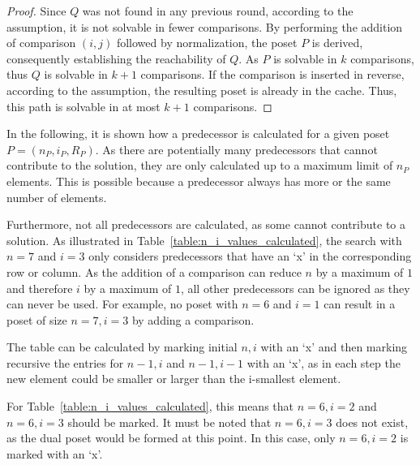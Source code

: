 \documentclass[10pt,journal,compsoc]{IEEEtran}
\begin{document}
\begin{proof} \label{proof:predecessor_calculation}
  Since $Q$ was not found in any previous round, according to the assumption, it is not solvable in fewer comparisons.
  By performing the addition of comparison $(i, j)$ followed by normalization, the poset $P$ is derived, consequently establishing the reachability of $Q$.
  As $P$ is solvable in $k$ comparisons, thus $Q$ is solvable in $k + 1$ comparisons.
  If the comparison is inserted in reverse, according to the assumption, the resulting poset is already in the cache.
  Thus, this path is solvable in at most $k + 1$ comparisons.
\end{proof}

In the following, it is shown how a predecessor is calculated for a given poset $P = (n_P, i_P, R_P)$. As there are potentially many predecessors that cannot contribute to the solution, they are only calculated up to a maximum limit of $n_P$ elements. This is possible because a predecessor always has more or the same number of elements.

Furthermore, not all predecessors are calculated, as some cannot contribute to a solution.
As illustrated in Table~\ref{table:n_i_values_calculated}, the search with $n = 7$ and $i = 3$ only considers predecessors that have an `x' in the corresponding row or column. As the addition of a comparison can reduce $n$ by a maximum of $1$ and therefore $i$ by a maximum of $1$, all other predecessors can be ignored as they can never be used.
For example, no poset with $n = 6$ and $i = 1$ can result in a poset of size $n = 7, i = 3$ by adding a comparison.

The table can be calculated by marking initial $n, i$ with an `x' and then marking recursive the entries for $n - 1, i$ and $n - 1, i - 1$ with an `x', as in each step the new element could be smaller or larger than the i-smallest element.

For Table~\ref{table:n_i_values_calculated}, this means that $n = 6, i = 2$ and $n = 6, i = 3$ should be marked.
It must be noted that $n = 6, i = 3$ does not exist, as the dual poset would be formed at this point.
In this case, only $n = 6, i = 2$ is marked with an `x'.
\end{document}
